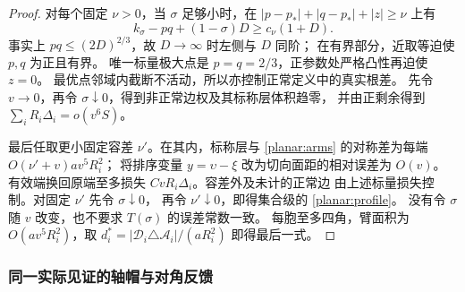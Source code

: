 \begin{proof}
对每个固定 \(\nu>0\)，当 \(\sigma\) 足够小时，在
\(|p-p_*|+|q-p_*|+|z|\ge\nu\) 上有
\[
 k_\sigma-pq+(1-\sigma)D\ge c_\nu(1+D).
\]
事实上 \(pq\le(2D)^{2/3}\)，故 \(D\to\infty\) 时左侧与 \(D\) 同阶；
在有界部分，近取等迫使 \(p,q\) 为正且有界。
唯一标量极大点是 \(p=q=2/3\)，正参数处严格凸性再迫使 \(z=0\)。
最优点邻域内截断不活动，所以亦控制正常定义中的真实根差。
先令 \(v\to0\)，再令 \(\sigma\downarrow0\)，得到非正常边权及其标称层体积趋零，
并由正剩余得到 \(\sum_iR_i\Delta_i=o(v^6S)\)。

最后任取更小固定容差 \(\nu'\)。在其内，标称层与
\eqref{planar:arms} 的对称差为每端 \(O(\nu'+v)av^5R_i^2\)；
将排序变量 \(y=\upsilon-\xi\) 改为切向面距的相对误差为 \(O(v)\)。
有效端换回原端至多损失 \(CvR_i\Delta_i\)。容差外及未计的正常边
由上述标量损失控制。对固定 \(\nu'\) 先令 \(\sigma\downarrow0\)，
再令 \(\nu'\downarrow0\)，即得集合级的 \eqref{planar:profile}。
没有令 \(\sigma\) 随 \(v\) 改变，也不要求 \(T(\sigma)\) 的误差常数一致。
每胞至多四角，臂面积为 \(O(av^5R_i^2)\)，取
\(d_i^*=|\mathscr D_i\triangle\mathcal A_i|/(aR_i^2)\) 即得最后一式。
\end{proof}

\subsubsection{同一实际见证的轴帽与对角反馈}

